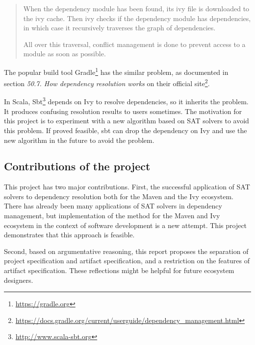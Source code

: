 \begin{quote}
  When the dependency module has been found, its ivy file is downloaded to the ivy cache. Then ivy checks if the dependency module has dependencies, in which case it recursively traverses the graph of dependencies.

  All over this traversal, conflict management is done to prevent access to a module as soon as possible.
\end{quote}

The popular build tool Gradle\footnote{\url{https://gradle.org}} has the similar problem, as documented in section \emph{50.7. How dependency resolution works} on their official site\footnote{\url{https://docs.gradle.org/current/userguide/dependency_management.html}}.

In Scala, Sbt\footnote{\url{http://www.scala-sbt.org}} depends on Ivy to resolve dependencies, so it inherits the problem. It produces confusing resolution results to users sometimes. The motivation for this project is to experiment with a new algorithm based on SAT solvers to avoid this problem. If proved feasible, sbt can drop the dependency on Ivy and use the new algorithm in the future to avoid the problem.

\subsection{Contributions of the project}

This project has two major contributions. First, the successful application of SAT solvers to dependency resolution both for the Maven and the Ivy ecosystem. There has already been many applications of SAT solvers in dependency management\cite{mancinelli2006managing, berre2009dependency, vouillon2013software}, but implementation of the method for the Maven and Ivy ecosystem in the context of software development is a new attempt. This project demonstrates that this approach is feasible.

Second, based on argumentative reasoning, this report proposes the separation of project specification and artifact specification, and a restriction on the features of artifact specification. These reflections might be helpful for future ecosystem designers.
